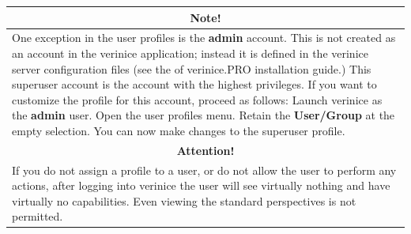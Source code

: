 \documentclass[a4paper,10pt]{book}
\begin{document}
\begin{longtable}{| p{} |}
\hline
\multicolumn{1}{|c|}{\textbf{Note!}} \\[10pt]
\hline\hline
One exception in the user profiles is the \textbf{admin} account. This is not created as an account in the verinice
application; instead it is defined in the verinice server configuration files (see the of verinice.PRO installation
guide.) This superuser account is the account with the highest privileges. If you want to customize the profile
for this account, proceed as follows: Launch verinice as the \textbf{admin} user. Open the user profiles menu.
Retain the \textbf{User/Group} at the empty selection. You can now make changes to the superuser profile. \\[10pt] \hline
\multicolumn{1}{|c|}{\textbf{Attention!}} \\[10pt]
\hline
If you do not assign a profile to a user, or do not allow the user to perform any actions, after logging into
verinice the user will see virtually nothing and have virtually no capabilities. Even viewing the standard
perspectives is not permitted. \\[10pt] \hline
\end{longtable}
\end{document}

